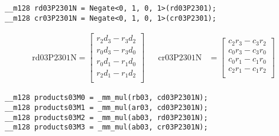 \begin{verbatim}
__m128 rd03P2301N = Negate<0, 1, 0, 1>(rd03P2301);
__m128 cr03P2301N = Negate<0, 1, 0, 1>(cr03P2301);
\end{verbatim}

\begin{align*}
\mathrm{rd03P2301N} 
=
\begin{bmatrix}
r_2d_3 - r_3d_2\\
r_0d_3 - r_3d_0\\
r_0d_1 - r_1d_0\\
r_2d_1 - r_1d_2\\
\end{bmatrix}
&&
\mathrm{cr03P2301N} 
&=
\begin{bmatrix}
c_2r_3 - c_3r_2\\
c_0r_3 - c_3r_0\\
c_0r_1 - c_1r_0\\
c_2r_1 - c_1r_2\\
\end{bmatrix}
\end{align*}

\begin{verbatim}
__m128 products03M0 = _mm_mul(rb03, cd03P2301N);
__m128 products03M1 = _mm_mul(ar03, cd03P2301N);
__m128 products03M2 = _mm_mul(ab03, rd03P2301N);
__m128 products03M3 = _mm_mul(ab03, cr03P2301N);
\end{verbatim}

